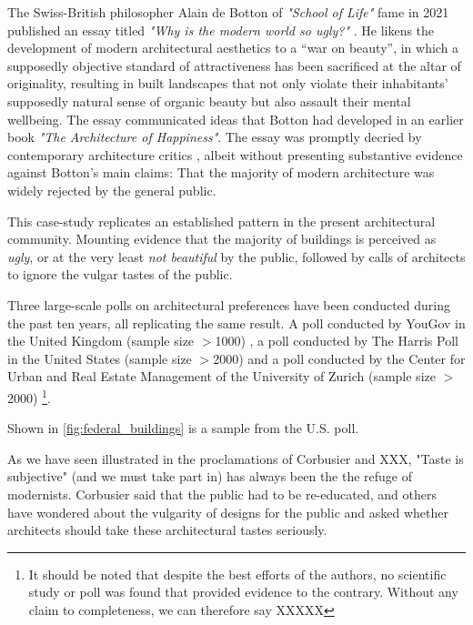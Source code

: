 \documentclass{article}
\begin{document}
\begin{multicols}{2}
    
The Swiss-British philosopher Alain de Botton of \textit{"School of Life"} fame in 2021 published an essay titled \textit{"Why is the modern world so ugly?"} \cite{howarth_why_2021}. He likens the development of modern architectural aesthetics to a “war on beauty”, in which a supposedly objective standard of attractiveness has been sacrificed at the altar of originality, resulting in built landscapes that not only violate their inhabitants’ supposedly natural sense of organic beauty but also assault their mental wellbeing. The essay communicated ideas that Botton had developed in an earlier book \textit{"The Architecture of Happiness"}. The essay was promptly decried by contemporary architecture critics \cite{rogan_trads_2021}, albeit without presenting substantive evidence against Botton's main claims: That the majority of modern architecture was widely rejected by the general public. 

This case-study replicates an established pattern in the present architectural community. Mounting evidence that the majority of buildings is perceived as \textit{ugly}, or at the very least \textit{not beautiful} by the public, followed by calls of architects to ignore the vulgar tastes of the public. 

Three large-scale polls on architectural preferences have been conducted during the past ten years, all replicating the same result. A poll conducted by YouGov in the United Kingdom (sample size $>$1000) \cite{noauthor_yougov_2009}, a poll conducted by The Harris Poll in the United States (sample size $>$2000) \cite{noauthor_americans_2020} and a poll conducted by the Center for Urban and Real Estate Management of the University of Zurich (sample size $>$2000) \cite{hollenstein_schone_2022} \footnote{It should be noted that despite the best efforts of the authors, no scientific study or poll was found that provided evidence to the contrary. Without any claim to completeness, we can therefore say XXXXX}.

Shown in \cref{fig:federal_buildings} is a sample from the U.S. poll.




As we have seen illustrated in the proclamations of Corbusier and XXX, "Taste is subjective" (and we must take part in) has always been the the refuge of modernists. Corbusier said that the public had to be re-educated, and others have wondered about the vulgarity of designs for the public and asked whether architects should take these architectural tastes seriously.

\end{multicols}
\end{document}
